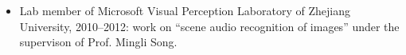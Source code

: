\documentclass[letterpaper]{article}
\begin{document}
\begin{itemize}
    \item Lab member of Microsoft Visual Perception Laboratory of Zhejiang University, 2010--2012: work on ``scene audio recognition of images'' under the supervison of Prof. Mingli Song. 
% 
% 
\end{itemize}
\end{document}
